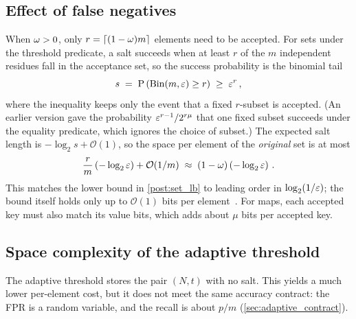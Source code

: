 \subsection{Effect of false negatives}
\label{sec:fn_effect}

When $\omega > 0$, only $r = \lceil (1-\omega)m \rceil$ elements need to be
accepted.
For sets under the threshold predicate, a salt succeeds when at least $r$ of
the $m$ independent residues fall in the acceptance set, so the success
probability is the binomial tail
\begin{equation}
    s \;=\; \Prob{\bindist(m, \fprate) \geq r} \;\geq\; \fprate^{r}\,,
\end{equation}
where the inequality keeps only the event that a fixed $r$-subset is
accepted.
(An earlier version gave the probability $\varepsilon^{r-1}/2^{r\mu}$ that one
fixed subset succeeds under the equality predicate, which ignores the choice of
subset.)
The expected salt length is $-\log_2 s + \mathcal{O}(1)$, so the space per
element of the \emph{original} set is at most
\begin{equation}
    \frac{r}{m}\left(-\log_2 \varepsilon\right) + \mathcal{O}(1/m)
    \;\approx\; (1 - \omega)\left(-\log_2 \varepsilon\right)\,.
\end{equation}
This matches the lower bound in \cref{post:set_lb} to leading order in
$\log_2(1/\varepsilon)$; the bound itself holds only up to $\mathcal{O}(1)$ bits
per element~\cite[Prop.~1]{pagh2001lossy}.
For maps, each accepted key must also match its value bits, which adds
about $\mu$ bits per accepted key.

\subsection{Space complexity of the adaptive threshold}
\label{sec:adaptive_space}

The adaptive threshold stores the pair $(N, t)$ with no salt.
This yields a much lower per-element cost, but it does not meet the same
accuracy contract: the FPR is a random variable, and the recall is about
$p/m$ (\cref{sec:adaptive_contract}).

